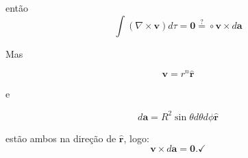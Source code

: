 \documentclass[a4paper,12pt]{article}
\newcommand{\printingbibliography}{%

    \pagestyle{myheadings}
    \markright{}
    \sloppy
    \printbibliography[heading=bibintoc, %
                   title=Refer\^encias %
                  ]
    \fussy%
}
\begin{document}
então
\begin{equation} 
\int(\nabla \times \mathbf{v}) d \tau=\mathbf{0} \stackrel{?}{=} \circ \mathbf{v} \times d \mathbf{a} 
\end{equation}

Mas 

\begin{equation}
    \mathbf{v}=r^{n} \hat{\mathbf{r}}
\end{equation}

e 

\begin{equation}
    d \mathbf{a}=R^{2}\sin \theta d \theta d \phi \hat{\mathbf{r}}
\end{equation}

estão ambos na direção de $\hat{\mathbf{r}}$, logo:
\begin{equation}
\mathbf{v} \times d \mathbf{a}=\mathbf{0} . \checkmark
\end{equation}

\end{document}
